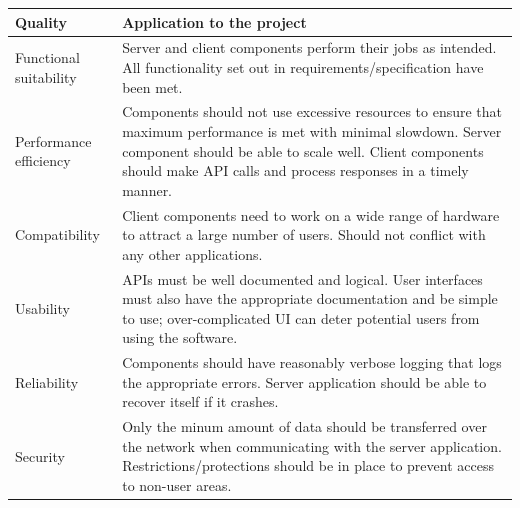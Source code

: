 \begin{longtable}{|p{}|p{}|}
    \hline
    Quality                & Application to the project                                                                                                                                                                                                                                                                                                         \\
    \hline\hline
    Functional suitability & Server and client components perform their jobs as intended. All functionality set out in requirements/specification have been met.                                                                                                                                                                                                \\
    \hline
    Performance efficiency & Components should not use excessive resources to ensure that maximum performance is met with minimal slowdown. Server component should be able to scale well. Client components should make API calls and process responses in a timely manner.                                                                                    \\
    \hline 
    Compatibility          & Client components need to work on a wide range of hardware to attract a large number of users. Should not conflict with any other applications.                                                                                                                                                                                    \\
    \hline
    Usability              & APIs must be well documented and logical. User interfaces must also have the appropriate documentation and be simple to use; over-complicated UI can deter potential users from using the software.                                                                                                                                \\
    \hline
    Reliability            & Components should have reasonably verbose logging that logs the appropriate errors. Server application should be able to recover itself if it crashes.                                                                                                                                                                             \\   
    \hline
    Security               & Only the minum amount of data should be transferred over the network when communicating with the server application. Restrictions/protections should be in place to prevent access to non-user areas.                                                                                                                              \\

\end{longtable}
